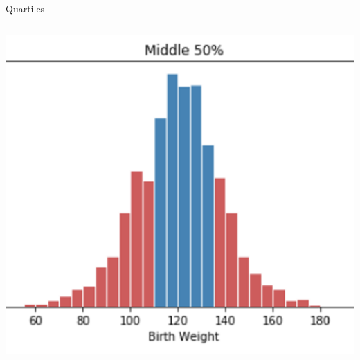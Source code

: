 \documentclass[aspectratio=169]{../latex_main/tntbeamer}  %
\begin{document}
\begin{frame}{Quartiles}
\begin{columns}
\begin{column}{.5\textwidth}
                       \includegraphics[scale=.6]{Bild37}

            \end{column}
        \end{columns}
	\end{frame}
	
\end{document}
